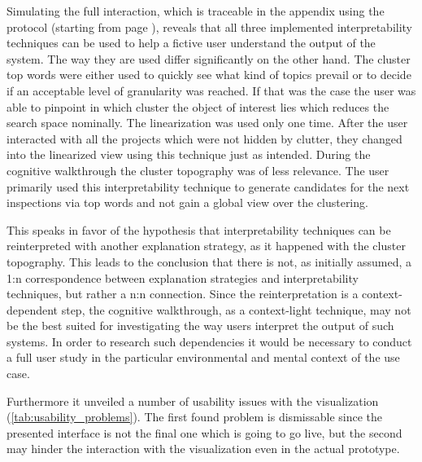 Simulating the full interaction, which is traceable in the appendix using the protocol (starting from page \pageref{ch:Appendix}),   reveals that all three implemented interpretability techniques can be used to help a fictive user understand the output of the system. The way they are used differ significantly on the other hand. 
The cluster top words were either used to quickly see what kind of topics prevail or to decide if an acceptable level of granularity was reached. If that was the case the user was able to pinpoint in which cluster the object of interest lies which reduces the search space nominally. 
The linearization was used only one time. After the user interacted with all the projects which were not hidden by clutter, they changed into the linearized view using this technique just as intended.
During the cognitive walkthrough the cluster topography was of less relevance. The user primarily used this interpretability technique to generate candidates for the next inspections via top words and not gain a global view over the clustering.

This speaks in favor of the hypothesis that interpretability techniques can be reinterpreted with another explanation strategy, as it happened with the cluster topography. This leads to the conclusion that there is not, as initially assumed, a 1:n correspondence between explanation strategies and interpretability techniques, but rather a n:n connection. Since the reinterpretation is a context-dependent step, the cognitive walkthrough, as a context-light technique, may not be the best suited for investigating the way users interpret the output of such systems. In order to research such dependencies it would be necessary to conduct a full user study in the particular environmental and mental context of the use case.

Furthermore it unveiled a number of usability issues with the visualization (\autoref{tab:usability_problems}). The first found problem is dismissable since the presented interface is not the final one which is going to go live, but the second may hinder the interaction with the visualization even in the actual prototype.


